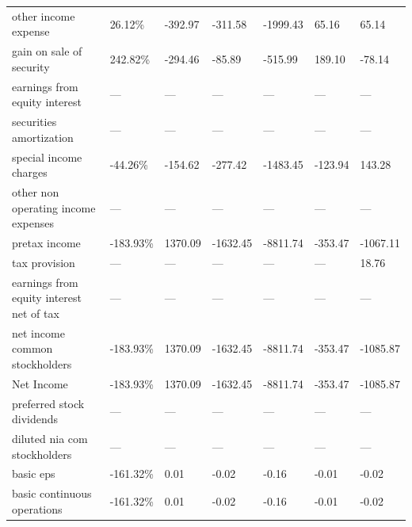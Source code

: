 \begin{table}[]
{\begin{tabular}{@{}lllllll@{}}
other income expense                                          & 26.12\%    & -392.97   & -311.58   & -1999.43 & 65.16    & 65.14    \\
gain on sale of security                                      & 242.82\%   & -294.46   & -85.89    & -515.99  & 189.10   & -78.14   \\
earnings from equity interest                                 & —          & —         & —         & —        & —        & —        \\
securities amortization                                       & —          & —         & —         & —        & —        & —        \\
special income charges                                        & -44.26\%   & -154.62   & -277.42   & -1483.45 & -123.94  & 143.28   \\
other non operating income expenses                           & —          & —         & —         & —        & —        & —        \\
pretax income                                                 & -183.93\%  & 1370.09   & -1632.45  & -8811.74 & -353.47  & -1067.11 \\
tax provision                                                 & —          & —         & —         & —        & —        & 18.76    \\
earnings from equity interest net of tax                      & —          & —         & —         & —        & —        & —        \\
net income common stockholders                                & -183.93\%  & 1370.09   & -1632.45  & -8811.74 & -353.47  & -1085.87 \\
Net Income                                                    & -183.93\%  & 1370.09   & -1632.45  & -8811.74 & -353.47  & -1085.87 \\
preferred stock dividends                                     & —          & —         & —         & —        & —        & —        \\
diluted nia com stockholders                                  & —          & —         & —         & —        & —        & —        \\
basic eps                                                     & -161.32\%  & 0.01      & -0.02     & -0.16    & -0.01    & -0.02    \\
basic continuous operations                                   & -161.32\%  & 0.01      & -0.02     & -0.16    & -0.01    & -0.02    \\

\end{tabular}}
\end{table}

